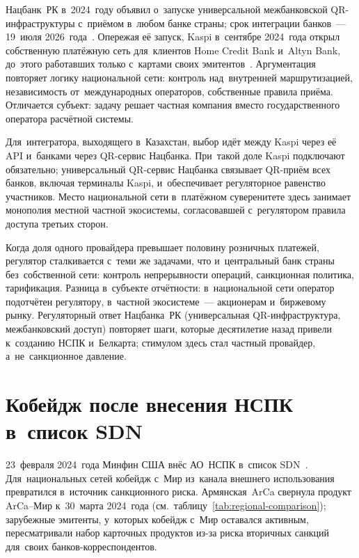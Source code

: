 Нацбанк~РК в~2024~году объявил о~запуске универсальной межбанковской
QR-инфраструктуры с~приёмом в~любом банке страны; срок интеграции банков~---
19~июля 2026~года~\cite{oninvest-kz-unified-qr-2026}. Опережая её запуск, Kaspi в~сентябре
2024~года открыл собственную платёжную сеть для~клиентов Home Credit Bank
и~Altyn Bank, до~этого работавших только с~картами своих
эмитентов~\cite{kaspi-opens-payments-2024}. Аргументация повторяет логику
национальной сети: контроль над~внутренней маршрутизацией, независимость
от~международных операторов, собственные правила приёма. Отличается субъект:
задачу решает частная компания вместо государственного оператора расчётной системы.

Для~интегратора, выходящего в~Казахстан, выбор идёт между Kaspi через её API и~банками через QR-сервис Нацбанка. При~такой доле
Kaspi подключают обязательно; универсальный QR-сервис Нацбанка связывает QR-приём
всех банков, включая терминалы Kaspi, и~обеспечивает регуляторное равенство участников. Место национальной
сети в~платёжном суверенитете здесь занимает монополия местной частной
экосистемы, согласовавшей с~регулятором правила доступа третьих сторон.

Когда доля одного провайдера превышает половину розничных платежей,
регулятор сталкивается с~теми же задачами, что и~центральный банк страны
без~собственной сети: контроль непрерывности операций, санкционная
политика, тарификация. Разница в~субъекте отчётности: в~национальной сети
оператор подотчётен регулятору, в~частной экосистеме~--- акционерам и~биржевому
рынку. Регуляторный ответ Нацбанка~РК (универсальная QR-инфраструктура,
межбанковский доступ) повторяет шаги, которые десятилетие назад привели
к~созданию НСПК и~Белкарта; стимулом здесь стал частный провайдер,
а~не~санкционное давление.

\section{Кобейдж после внесения НСПК в~список SDN}\label{sec:regional-after-sdn}

23~февраля 2024~года Минфин США внёс АО~НСПК в~список SDN~\cite{ofac-jy2117-nspk}. Для~национальных сетей кобейдж
с~Мир из~канала внешнего использования превратился в~источник санкционного
риска. Армянская~ArCa свернула продукт ArCa--Мир к~30~марта 2024~года
(см.~таблицу~\ref{tab:regional-comparison}); зарубежные эмитенты, у~которых
кобейдж с~Мир оставался активным, пересматривали набор карточных продуктов из-за
риска вторичных санкций для~своих банков-корреспондентов.

